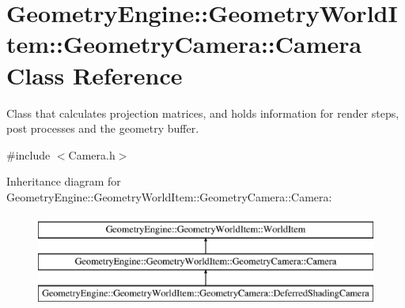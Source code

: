 \hypertarget{class_geometry_engine_1_1_geometry_world_item_1_1_geometry_camera_1_1_camera}{}\section{Geometry\+Engine\+::Geometry\+World\+Item\+::Geometry\+Camera\+::Camera Class Reference}
\label{class_geometry_engine_1_1_geometry_world_item_1_1_geometry_camera_1_1_camera}


Class that calculates projection matrices, and holds information for render steps, post processes and the geometry buffer.  




{\ttfamily \#include $<$Camera.\+h$>$}

Inheritance diagram for Geometry\+Engine\+::Geometry\+World\+Item\+::Geometry\+Camera\+::Camera\+:\begin{figure}[H]
\begin{center}
\leavevmode
\includegraphics[height=3.000000cm]{class_geometry_engine_1_1_geometry_world_item_1_1_geometry_camera_1_1_camera}
\end{center}
\end{figure}
